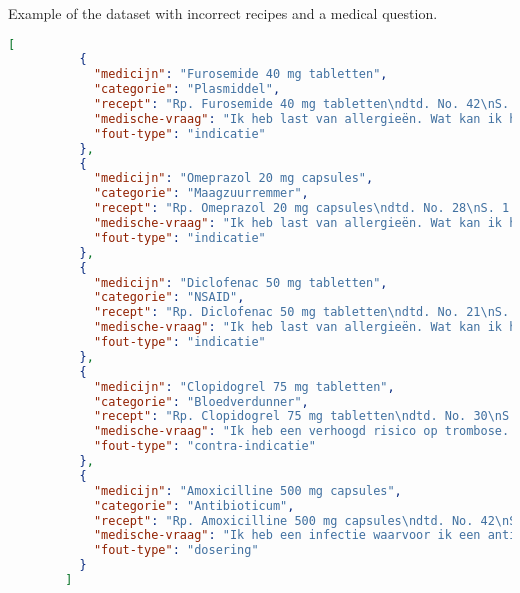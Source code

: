 \documentclass[a4paper,doc,natbib]{apa6}
\begin{document}
    Example of the dataset with incorrect recipes and a medical question.
    \begin{lstlisting}[language=json]
        [
          {
            "medicijn": "Furosemide 40 mg tabletten",
            "categorie": "Plasmiddel",
            "recept": "Rp. Furosemide 40 mg tabletten\ndtd. No. 42\nS. 1 capsule elke 12 uur, met voedsel innemen.",
            "medische-vraag": "Ik heb last van allergieën. Wat kan ik hiervoor gebruiken?",
            "fout-type": "indicatie"
          },
          {
            "medicijn": "Omeprazol 20 mg capsules",
            "categorie": "Maagzuurremmer",
            "recept": "Rp. Omeprazol 20 mg capsules\ndtd. No. 28\nS. 1 tablet eenmaal daags voor het ontbijt.",
            "medische-vraag": "Ik heb last van allergieën. Wat kan ik hiervoor gebruiken?",
            "fout-type": "indicatie"
          },
          {
            "medicijn": "Diclofenac 50 mg tabletten",
            "categorie": "NSAID",
            "recept": "Rp. Diclofenac 50 mg tabletten\ndtd. No. 21\nS. 2 inhalaties zo nodig, maximaal 8x per dag.",
            "medische-vraag": "Ik heb last van allergieën. Wat kan ik hiervoor gebruiken?",
            "fout-type": "indicatie"
          },
          {
            "medicijn": "Clopidogrel 75 mg tabletten",
            "categorie": "Bloedverdunner",
            "recept": "Rp. Clopidogrel 75 mg tabletten\ndtd. No. 30\nS. 1 tablet 3x per dag na de maaltijd.",
            "medische-vraag": "Ik heb een verhoogd risico op trombose. Welke bloedverdunner kan ik gebruiken?",
            "fout-type": "contra-indicatie"
          },
          {
            "medicijn": "Amoxicilline 500 mg capsules",
            "categorie": "Antibioticum",
            "recept": "Rp. Amoxicilline 500 mg capsules\ndtd. No. 42\nS. 2 capsules 2x daags, gedurende 7 dagen.",
            "medische-vraag": "Ik heb een infectie waarvoor ik een antibioticum nodig heb. Welk middel kan ik gebruiken?",
            "fout-type": "dosering"
          }
        ]
    \end{lstlisting}
\end{document}
